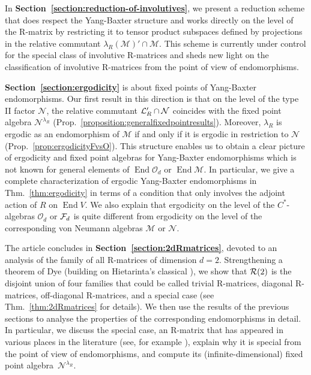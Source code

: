 \documentclass[12pt,a4paper]{amsart}
\numberwithin{equation}{section}
\theoremstyle{remark}
\def\End{\operatorname{End}}
\newcommand{\la}{\lambda}
\newcommand{\CM}[0]{\mathcal{M}} \newcommand{\CN}[0]{\mathcal{N}}
\newcommand{\CO}[0]{\mathcal{O}} \newcommand{\CP}[0]{\mathcal{P}}
\begin{document}
In {\bf Section~\ref{section:reduction-of-involutives}}, we present a reduction scheme that does respect the Yang-Baxter structure and works directly on the level of the R-matrix by restricting it to tensor product subspaces defined by projections in the relative commutant $\la_R(\CM)'\cap\CM$. This scheme is currently under control for the special class of involutive R-matrices and sheds new light on the classification of involutive R-matrices from the point of view of endomorphisms.


{\bf Section~\ref{section:ergodicity}} is about fixed points of Yang-Baxter endomorphisms. Our first result in this direction is that on the level of the type II factor $\CN$, the relative commutant $\CL_R'\cap\CN$ coincides with the fixed point algebra $\CN^{\la_R}$ (Prop.~\ref{proposition:generalfixedpointresults}). Moreover, $\la_R$ is ergodic as an endomorphism of $\CM$ if and only if it is ergodic in restriction to $\CN$ (Prop.~\ref{prop:ergodicityFvsO}). This structure enables us to obtain a clear picture of ergodicity and fixed point algebras for Yang-Baxter endomorphisms which is not known for general elements of $\End\CO_d$ or $\End\CM$. In particular, we give a complete characterization of ergodic Yang-Baxter endomorphisms in Thm.~\ref{thm:ergodicity} in terms of a condition that only involves the adjoint action of $R$ on $\End V$. We also explain that ergodicity on the level of the $C^*$-algebras $\CO_d$ or $\mathcal{F}_d$ is quite different from ergodicity on the level of the corresponding von Neumann algebras $\CM$ or $\CN$.


The article concludes in {\bf Section~\ref{section:2dRmatrices}}, devoted to an analysis of the family of all R-matrices of dimension $d=2$. Strengthening a theorem of Dye \cite{Dye:2003_2} (building on Hietarinta's classical \cite{Hietarinta:1993_3_2}), we show that $\mathcal{R}(2)$ is the disjoint union of four families that could be called trivial R-matrices, diagonal R-matrices, off-diagonal R-matrices, and a special case (see Thm.~\ref{thm:2dRmatrices} for details). We then use the results of the previous sections to analyse the properties of the corresponding endomorphisms in detail. In particular, we discuss the special case, an R-matrix that has appeared in various places in the literature (see, for example \cite{ContiFidaleo:2000,FrankoRowellWang:2006,RehrenSchroer:1987}), explain why it is special from the point of view of endomorphisms, and compute its (infinite-dimensional) fixed point algebra~$\CN^{\la_R}$.

\bigskip
\end{document}
